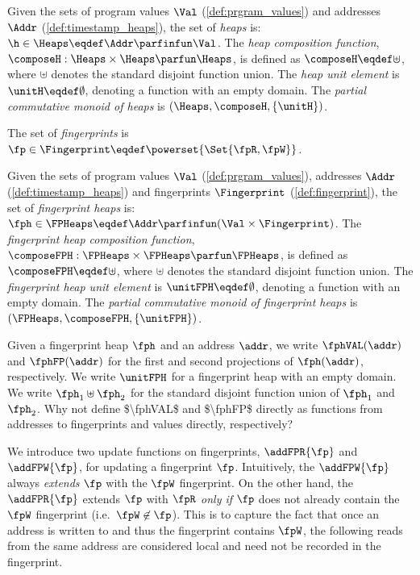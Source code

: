 \begin{definition}[Heaps]\label{def:heaps}
Given the sets of program values $\Val$ (\ref{def:prgram_values}) and  addresses $\Addr$ (\ref{def:timestamp_heaps}), the set of \emph{ heaps} is: $\h \in \Heaps \eqdef \Addr \parfinfun \Val$.
The \emph{heap composition function}, $\composeH: \Heaps \times \Heaps \parfun \Heaps$, is defined as $\composeH \eqdef \uplus$, where $\uplus$ denotes the standard disjoint function union. The \emph{ heap unit element} is $\unitH \eqdef \emptyset$, denoting a function with an empty domain.
The \emph{partial commutative monoid of  heaps} is $(\Heaps, \composeH, \{\unitH\})$.
\end{definition}
 
\begin{defn}[Fingerprints]
\label{def:fingerprint}
The set of \emph{fingerprints} is $\fp \in \Fingerprint \eqdef \powerset{\Set{\fpR,\fpW}}$.
\end{defn}
 
\begin{defn}
\label{def:fingerprint_heaps}
Given the sets of program values $\Val$ (\ref{def:prgram_values}), addresses $\Addr$ (\ref{def:timestamp_heaps}) and fingerprints $\Fingerprint$ (\ref{def:fingerprint}), the set of \emph{fingerprint heaps} is: $\fph \in \FPHeaps \eqdef \Addr \parfinfun (\Val \times \Fingerprint)$.
The \emph{fingerprint heap composition function}, $\composeFPH: \FPHeaps \times \FPHeaps \parfun \FPHeaps$, is defined as $\composeFPH \eqdef \uplus$, where $\uplus$ denotes the standard disjoint function union. The \emph{fingerprint heap unit element} is $\unitFPH \eqdef \emptyset$, denoting a function with an empty domain.
The \emph{partial commutative monoid of fingerprint heaps} is $(\FPHeaps, \composeFPH, \{\unitFPH\})$.  
\end{defn}
 
Given a fingerprint heap $\fph$ and an address $\addr$, we write $\fphVAL(\addr)$ and $\fphFP(\addr)$ for the first and second projections of $\fph(\addr)$, respectively. We write $\unitFPH$ for a fingerprint heap with an empty domain. We write $\fph_1 \uplus \fph_2$ for the standard disjoint function union of $\fph_1$ and $\fph_2$. 
\ac{Why not define $\fphVAL$ and $\fphFP$ directly as functions from addresses to fingerprints and values directly, respectively?}

We introduce two update functions on fingerprints, $\addFPR{\fp}$ and $\addFPW{\fp}$, for updating a fingerprint $\fp$. Intuitively, the $\addFPW{\fp}$ always \emph{extends} $\fp$ with the $\fpW$ fingerprint. On the other hand, the $\addFPR{\fp}$ extends $\fp$ with $\fpR$ \emph{only if} $\fp$ does not already contain the $\fpW$ fingerprint (i.e.~$\fpW \not\in \fp$). This is to capture the fact that once an address is written to and thus the fingerprint contains $\fpW$, the following reads from the same address are considered local and need not be recorded in the fingerprint.
 
